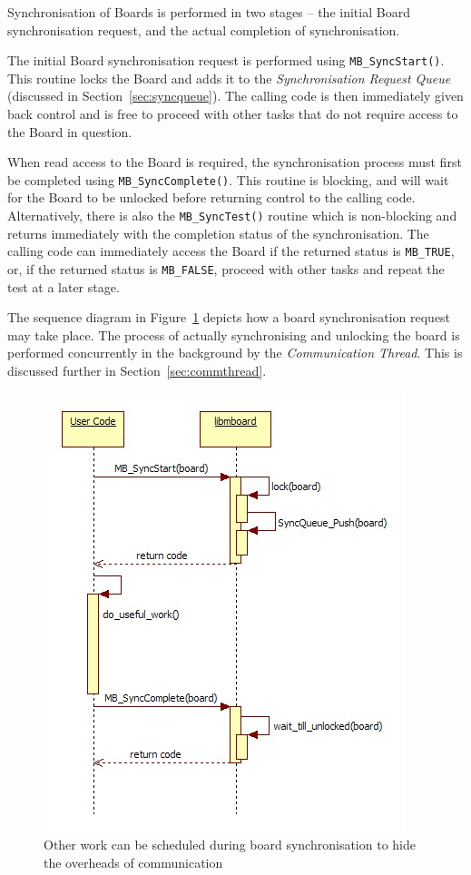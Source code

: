 Synchronisation of Boards is performed in two stages -- the initial Board synchronisation request, and the actual completion of synchronisation.

The initial Board synchronisation request is performed using \texttt{MB\_SyncStart()}. This routine locks the Board and adds it to the \textit{Synchronisation Request Queue} (discussed in Section~\ref{sec:syncqueue}). The calling code is then immediately given back control and is free to proceed with other tasks that do not require access to the Board in question. 

When read access to the Board is required, the synchronisation process must first be completed using \texttt{MB\_SyncComplete()}. This routine is blocking, and will wait for the Board to be unlocked before returning control to the calling code. Alternatively, there is also the \texttt{MB\_SyncTest()} routine which is non-blocking and returns immediately with the completion status of the synchronisation. The calling code can immediately access the Board if the returned status is \texttt{MB\_TRUE}, or, if the returned status is \texttt{MB\_FALSE}, proceed with other tasks and repeat the test at a later stage.

The sequence diagram in  Figure~\ref{fig:syncboard} depicts how a board synchronisation request may take place. The process of actually synchronising and unlocking the board is performed concurrently in the background by the \textit{Communication Thread}. This is discussed further in Section~\ref{sec:commthread}.

\begin{figure}[ht]
 \centering
  \includegraphics[scale=0.60]{syncboard.jpg}
 \caption{Other work can be scheduled during board synchronisation to hide the overheads of communication}
 \label{fig:syncboard}
\end{figure}

